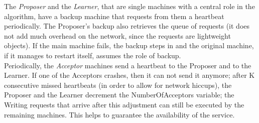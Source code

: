 \documentclass[paper=a4, fontsize=11pt]{scrartcl} %
\numberwithin{equation}{section} %
\numberwithin{figure}{section} %
\numberwithin{table}{section} %
\begin{document}
The \textit{Proposer} and the \textit{Learner}, that are single machines with a central role in the algorithm, have a backup machine that requests from them a heartbeat periodically. The Proposer's backup also retrieves the queue of requests (it does not add much overhead on the network, since the requests are lightweight objects). If the main machine fails, the backup steps in and the original machine, if it manages to restart itself, assumes the role of backup.\\
Periodically, the \textit{Acceptor} machines send a heartbeat to the Proposer and to the Learner. If one of the Acceptors crashes, then it can not send it anymore; after K consecutive missed heartbeats (in order to allow for network hiccups), the Proposer and the Learner decrement the NumberOfAcceptors variable; the Writing requests that arrive after this adjustment can still be executed by the remaining machines. This helps to guarantee the availability of the service.\\




 
\end{document}
